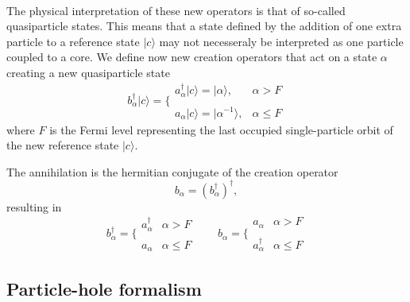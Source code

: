 \documentclass[%
twoside,                 %
final,                   %
10pt]{article}
\begin{document}
\paragraph{}
The physical interpretation of these new operators is that of so-called quasiparticle states.
This means that a state defined by the addition of one extra particle to a reference state $|c\rangle $ may not necesseraly be interpreted as one particle coupled to a core.
We define now new creation operators that act on a state $\alpha$ creating a new quasiparticle state
\begin{equation}
	b_\alpha^\dagger|c\rangle  = \Bigg\{ \begin{array}{ll}
		a_\alpha^\dagger |c\rangle  = |\alpha\rangle, & \alpha > F \\
		\\
		a_\alpha |c\rangle  = |\alpha^{-1}\rangle, & \alpha \leq F
	\end{array} \label{eq:2-52}
\end{equation}
where $F$ is the Fermi level representing the last  occupied single-particle orbit 
of the new reference state $|c\rangle $. 


The annihilation is the hermitian conjugate of the creation operator
\[
	b_\alpha = (b_\alpha^\dagger)^\dagger,
\]
resulting in
\begin{equation}
	b_\alpha^\dagger = \Bigg\{ \begin{array}{ll}
		a_\alpha^\dagger & \alpha > F \\
		\\
		a_\alpha & \alpha \leq F
	\end{array} \qquad 
	b_\alpha = \Bigg\{ \begin{array}{ll}
		a_\alpha & \alpha > F \\
		\\
		 a_\alpha^\dagger & \alpha \leq F
	\end{array} \label{eq:2-54}
\end{equation}



\subsection*{Particle-hole formalism}

\end{document}
